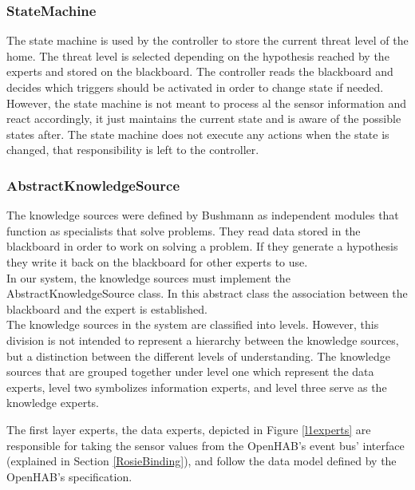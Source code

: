 \subsubsection{StateMachine}
\label{StateMachine}
The state machine is used by the controller to store the current threat level of the home. The threat level is selected depending on the hypothesis reached by the experts and stored on the blackboard. The controller reads the blackboard and decides which triggers should be activated in order to change state if needed. However, the state machine is not meant to process al the sensor information and react accordingly, it just maintains the current state and is aware of the possible states after. The state machine does not execute any actions when the state is changed, that responsibility is left to the controller.

\subsubsection{AbstractKnowledgeSource}

The knowledge sources were defined by Bushmann \etAl \cite{Buschmann:1996:PSA:249013} as independent modules that function as specialists that solve problems. They read data stored in the blackboard in order to work on solving a problem. If they generate a hypothesis they write it back on the blackboard for other experts to use.\\
In our system, the knowledge sources must implement the AbstractKnowledgeSource class. In this abstract class the association between the blackboard and the expert is established. \\
The knowledge sources in the system are classified into levels. However, this division is not intended to represent a hierarchy between the knowledge sources, but a distinction between the different levels of understanding. The knowledge sources that are grouped together under level one which represent the data experts, level two symbolizes information experts, and level three serve as the knowledge experts.


The first layer experts, the data experts, depicted in Figure \ref{l1experts} are responsible for taking the sensor values from the OpenHAB's event bus' interface (explained in Section \ref{RosieBinding}), and follow the data model defined by the OpenHAB's specification. 

